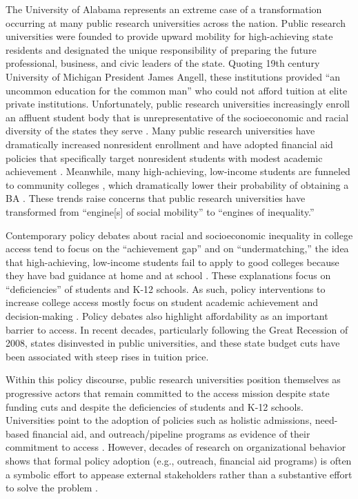 \documentclass[twoside]{article}
\begin{document}
The University of Alabama represents an extreme case of a transformation occurring at many public research universities across the nation.  Public research universities were founded to provide upward mobility for high-achieving state residents \citep{RN2269} and designated the unique responsibility of preparing the future professional, business, and civic leaders of the state.  Quoting 19th century University of Michigan President James Angell, these institutions provided ``an uncommon education for the common man'' \citep[as cited in][p. 279]{RN3608} who could not afford tuition at elite private institutions.  Unfortunately, public research universities increasingly enroll an affluent student body that is unrepresentative of the socioeconomic and racial diversity of the states they serve \citep{RN3685,RN4247,RN4438,RN4439}. Many public research universities have dramatically increased nonresident enrollment \citep{RN3753} and have adopted financial aid policies that specifically target nonresident students with modest academic achievement \citep{RN1469,RN3762,RN4032,RN4409}. Meanwhile, many high-achieving, low-income students are funneled to community colleges \citep{RN4429}, which dramatically lower their probability of obtaining a BA \citep{RN2261,RN4404}. These trends raise concerns that public research universities have transformed from ``engine[s] of social mobility'' \citep[][p. 3]{RN1149} to ``engines of inequality.''

Contemporary policy debates about racial and socioeconomic inequality in college access tend to focus on the ``achievement gap'' and on ``undermatching,'' the idea that high-achieving, low-income students fail to apply to good colleges because they have bad guidance at home and at school \citep{RN4016}.  These explanations focus on ``deficiencies'' of students and K-12 schools. As such, policy interventions to increase college access mostly focus on student academic achievement and decision-making \citep{RN4351}. Policy debates also highlight affordability as an important barrier to access. In recent decades, particularly following the Great Recession of 2008, states disinvested in public universities, and these state budget cuts have been associated with steep rises in tuition price.

Within this policy discourse, public research universities position themselves as progressive actors that remain committed to the access mission despite state funding cuts and despite the deficiencies of students and K-12 schools. Universities point to the adoption of policies such as holistic admissions, need-based financial aid, and outreach/pipeline programs as evidence of their commitment to access \citep{RN4017}.  However, decades of research on organizational behavior shows that formal policy adoption (e.g., outreach, financial aid programs) is often a symbolic effort to appease external stakeholders rather than a substantive effort to solve the problem \citep{RN2436}.
\end{document}
